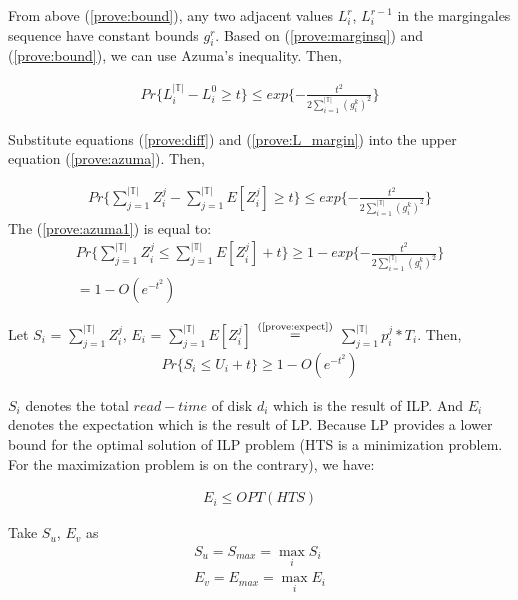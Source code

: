 \documentclass[conference]{IEEEtran}
\begin{document}
From above (\ref{prove:bound}), any two adjacent values $L_i^r$, $L_i^{r-1}$ in the margingales sequence have constant bounds $g_i^r$. Based on (\ref{prove:marginsq}) and (\ref{prove:bound}), we can use Azuma's inequality. Then, 

\begin{align}
Pr\{L_i^{|\mathbb{T}|} - L_i^{0} \geq t\} \leq exp\{-\frac{t^2}{2\sum_{ i = 1 }^{|\mathbb{T}|}(g_i^k)^2}\} \label{prove:azuma}
\end{align}

Substitute equations (\ref{prove:diff}) and (\ref{prove:L_margin}) into the upper equation (\ref{prove:azuma}). Then, 

\begin{align}
Pr\{\sum_{j = 1}^{|\mathbb{T}|} Z_i^j - 
	\sum_{j = 1}^{|\mathbb{T}|} E[Z_i^j]\geq t\} \leq exp\{-\frac{t^2}{2\sum_{ i = 1 }^{|\mathbb{T}|}(g_i^k)^2}\} \label{prove:azuma1}
\end{align}
 The (\ref{prove:azuma1}) is equal to:
\begin{align}
Pr\{\sum_{j = 1}^{|\mathbb{T}|} Z_i^j \leq \sum_{j = 1}^{|\mathbb{T}|} E[Z_i^j] + t\} \geq 1 - exp\{-\frac{t^2}{2\sum_{ i = 1 }^{|\mathbb{T}|}(g_i^k)^2}\}\nonumber\\
= 1 - O(e^{-t^2})\label{prove:azuma3}
\end{align}

Let $S_i$  = $\sum_{j = 1}^{|\mathbb{T}|} Z_i^j$,
$E_i$ = $\sum_{j = 1}^{|\mathbb{T}|} E[Z_i^j]$
$\overset{\text{(\ref{prove:expect})}}{=}$
$\sum_{j = 1}^{|\mathbb{T}|} p_i^j*T_i$. Then,
\begin{align}
Pr\{S_i \leq U_i + t\} \geq 1- O(e^{-t^2}) \label{prove:SU}
\end{align}

$S_i$ denotes the total $read-time$ of disk $d_i$ which is the result of ILP. And $E_i$ denotes the expectation which is the result of LP. Because LP provides a lower bound for the optimal solution of ILP problem (HTS is a minimization problem. For the maximization problem is on the contrary), we have:



\begin{align}
E_i \leq OPT(HTS)\label{prove:OPT}
\end{align}

Take $S_u$, $E_v$ as
\begin{align}
	S_u = S_{max} = \max_i S_i\\
	E_v = E_{max} = \max_i E_i\label{prove:Emax}
\end{align}
\end{document}

